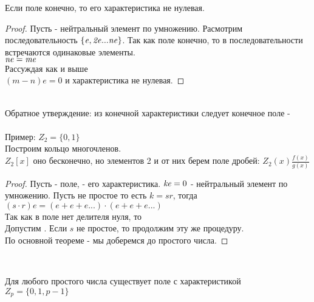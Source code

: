 \begin{theorem}
  Если поле конечно, то его характеристика не нулевая.
\end{theorem}

\begin{proof}
  Пусть  - нейтральный элемент по умножению. Расмотрим последовательность
  $\mathit {\{e,2e...ne\}}$. Так как поле конечно, то в последовательности
  встречаются одинаковые элементы.\\
  $\mathit{ne=me}$ \\
  Рассуждая как и выше \\
  $\mathit {(m-n)e=0}$ и характеристика не нулевая.
\end{proof}

 \\
Обратное утверждение: из конечной характеристики следует конечное поле -
 \\

\\
Пример: $Z_{2} = \{0,1\}$ \\
Построим кольцо многочленов. \\
$Z_{2}[x]$ оно бесконечно, но элементов 2 и от них берем поле дробей:
$Z_{2}(x) \frac{f(x)}{g(x)}$ \\

\begin{theorem}
\end{theorem}

\begin{proof}
  Пусть  - поле,  - его характеристика. $\mathit{ke}=0$  -
  нейтральный элемент по умножению. Пусть  не простое то есть $k = sr$,
  тогда $(s \cdot r)e = (e+e+e...) \cdot (e+e+e...)$ \\
  Так как в поле нет делителя нуля, то  \\
  Допустим . Если $s$ не простое, то продолжим эту же процедуру.\\
  По основной теореме - мы доберемся до простого числа.
\end{proof}

\\

\begin{theorem}
  Для любого простого числа  существует поле с характеристикой  \\
  $Z_{p} = \{0,1, p-1\}$
\end{theorem}

